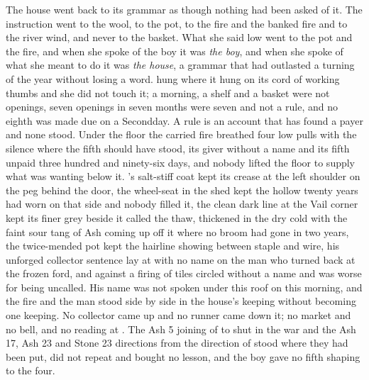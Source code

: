 \scenebreak

The house went back to its grammar as though nothing had been asked of it. The instruction went to the wool, to the pot, to the fire and the banked fire and to the river wind, and never to the basket. What she said low went to the pot and the fire, and when she spoke of the boy it was \emph{the boy}, and when she spoke of what she meant to do it was \emph{the house}, a grammar that had outlasted a turning of the year without losing a word.  hung where it hung on its cord of working thumbs and she did not touch it; a morning, a shelf and a basket were not openings, seven openings in seven months were seven and not a rule, and no eighth was made due on a Secondday. A rule is an account that has found a payer and none stood. Under the floor the carried fire breathed four low pulls with the silence where the fifth should have stood, its giver without a name and its fifth unpaid three hundred and ninety-six days, and nobody lifted the floor to supply what was wanting below it. 's salt-stiff coat kept its crease at the left shoulder on the peg behind the door, the wheel-seat in the shed kept the hollow twenty years had worn on that side and nobody filled it, the clean dark line at the Vail corner kept its finer grey beside it called the thaw, thickened in the dry cold with the faint sour tang of Ash coming up off it where no broom had gone in two years, the twice-mended pot kept the hairline showing between staple and wire, his unforged collector sentence lay at  with no name on the man who turned back at the frozen ford, and  against a firing of tiles circled without a name and was worse for being uncalled. His name was not spoken under this roof on this morning, and the fire and the man stood side by side in the house's keeping without becoming one keeping. No collector came up  and no runner came down it; no market and no bell, and no reading at . The Ash 5 joining of  to  shut in the war and the Ash 17, Ash 23 and Stone 23 directions from the direction of  stood where they had been put, did not repeat and bought no lesson, and the boy gave no fifth shaping to the four.

